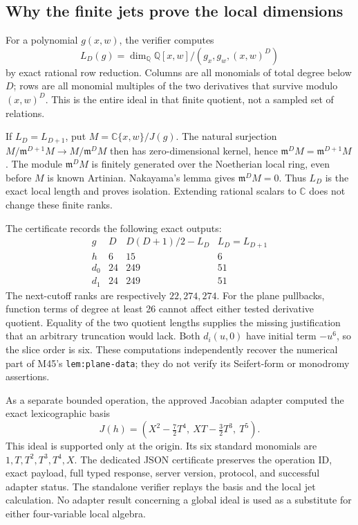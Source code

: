 \documentclass[11pt]{article}
\newcommand{\C}{\mathbb C}
\newcommand{\Q}{\mathbb Q}
\begin{document}
\subsection*{Why the finite jets prove the local dimensions}
For a polynomial \(g(x,w)\), the verifier computes
\[
 L_D(g)=\dim_\Q \Q[x,w]/(g_x,g_w,(x,w)^D)
\]
by exact rational row reduction.  Columns are all monomials of
total degree below \(D\); rows are all monomial multiples of the
two derivatives that survive modulo \((x,w)^D\).
This is the entire ideal in that finite quotient, not a sampled
set of relations.

If \(L_D=L_{D+1}\), put \(M=\C\{x,w\}/J(g)\).  The natural
surjection \(M/\mathfrak m^{D+1}M\to M/\mathfrak m^DM\)
then has zero-dimensional kernel, hence
\(\mathfrak m^DM=\mathfrak m^{D+1}M\).
The module \(\mathfrak m^DM\) is finitely generated over the
Noetherian local ring, even before \(M\) is known Artinian.
Nakayama's lemma \cite[Tag 00DV, part (2)]{stacks} gives
\(\mathfrak m^DM=0\).  Thus \(L_D\) is the exact local length
and proves isolation.  Extending rational scalars to \(\C\)
does not change these finite ranks.

The certificate records the following exact outputs:
\[
\begin{array}{c|c|c|c}
g&D&D(D+1)/2-L_D&L_D=L_{D+1}\\ \hline
h&6&15&6\\
d_0&24&249&51\\
d_1&24&249&51
\end{array}
\]
The next-cutoff ranks are respectively \(22,274,274\).
For the plane pullbacks, function terms of degree at least 26
cannot affect either tested derivative quotient.  Equality of the
two quotient lengths supplies the missing justification that an
arbitrary truncation would lack.
Both \(d_i(u,0)\) have initial term \(-u^6\), so the slice order
is six.  These computations independently recover the numerical
part of M45's \texttt{lem:plane-data}; they do not verify its
Seifert-form or monodromy assertions.

As a separate bounded operation, the approved Jacobian adapter
computed the exact lexicographic basis
\[
 J(h)=\left(X^2-\tfrac72T^4,\ XT-\tfrac32T^3,\ T^5\right).
\]
This ideal is supported only at the origin.  Its six standard
monomials are \(1,T,T^2,T^3,T^4,X\).
The dedicated JSON certificate preserves the operation ID,
exact payload, full typed response, server version, protocol, and
successful adapter status.  The standalone verifier replays the
basis and the local jet calculation.  No adapter result concerning
a global ideal is used as a substitute for either four-variable
local algebra.
\end{document}
